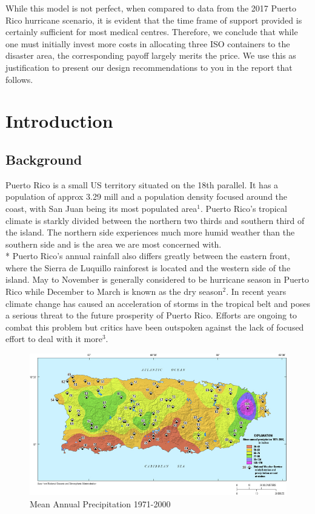 \documentclass[a4paper,12pt]{article}
\begin{document}
While this model is not perfect, when compared to data from the 2017 Puerto Rico hurricane scenario, it is evident that the time frame of support provided is certainly sufficient for most medical centres. Therefore, we conclude that while one must initially invest more costs in allocating three ISO containers to the disaster area, the corresponding payoff largely merits the price. We use this as justification to present our design recommendations to you in the report that follows.

\newpage


\tableofcontents
\newpage



\newpage

\pagestyle{style1}


\section{Introduction}

\subsection{Background}
Puerto Rico is a small US territory situated on the 18th parallel. It has a population of approx 3.29 mill and a population density focused around the coast,
with San Juan being its most populated area$^{1}$. Puerto Rico's tropical climate is starkly divided between the northern two thirds and southern third of the island.
The northern side experiences much more humid weather than the southern side and is the area we are most concerned with.\\* Puerto Rico's annual rainfall also differs greatly between the eastern front, where the Sierra de Luquillo rainforest is located and the western side of the island.
May to November is generally considered to be hurricane season in Puerto Rico while December to March is known as the dry season$^{2}$.
In recent years climate change has caused an acceleration of storms in the tropical belt and poses a serious threat to the future prosperity of Puerto Rico. Efforts are ongoing to combat this problem but critics have been outspoken against the lack
of focused effort to deal with it more$^{3}$.

\begin{figure}[h]
\centering
\includegraphics[scale =0.5]{Rainfall}
\caption{Mean Annual Precipitation 1971-2000}
\label{rainfall}
\end{figure}
\end{document}
